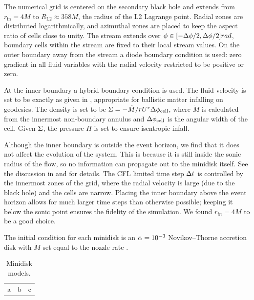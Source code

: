 The numerical grid is centered on the secondary black hole and extends from $r_\text{in} = 4 M$ to $R_\text{L2} \approx 358 M$, the radius of the L2 Lagrange point. Radial zones are distributed logarithmically, and azimuthal zones are placed to keep the aspect ratio of cells close to unity. The stream extends over $\phi \in [-\Delta \phi / 2, \Delta \phi / 2] rad$, boundary cells within the stream are fixed to their local stream values. On the outer boundary away from the stream a diode boundary condition is used: zero gradient in all fluid variables with the radial velocity restricted to be positive or zero.

At the inner boundary a hybrid boundary condition is used.  The fluid velocity is set to be exactly as given in , appropriate for ballistic matter infalling on geodesics.  The density is set to be $\Sigma = -\dot{M} / r U^r \Delta \phi_\text{cell}$, where $\dot{M}$ is calculated from the innermost non-boundary annulus and $\Delta \phi_\text{cell}$ is the angular width of the cell.  Given $\Sigma$, the pressure $\Pi$ is set to ensure isentropic infall.

Although the inner boundary is outside the event horizon, we find that it does not affect the evolution of the system.  This is because it is still inside the sonic radius of the flow, so no information can propagate out to the minidisk itself.  See the discussion in  and  for details. The CFL limited time step $\Delta t$ is controlled by the innermost zones of the grid, where the radial velocity is large (due to the black hole) and the cells are narrow.  Placing the inner boundary above the event horizon allows for much larger time steps than otherwise possible; keeping it below the sonic point ensures the fidelity of the simulation.  We found $r_{in} = 4M$ to be a good choice.

The initial condition for each minidisk is an $\alpha=10^{-3}$ Novikov--Thorne accretion disk with $\dot{M}$ set equal to the nozzle rate \citep{Novikov73}.  

\begin{table}
\begin{center}
\begin{tabular}{ccc}
a&b&c
\end{tabular}
\end{center}
\caption{ Minidisk models.}
\end{table}

